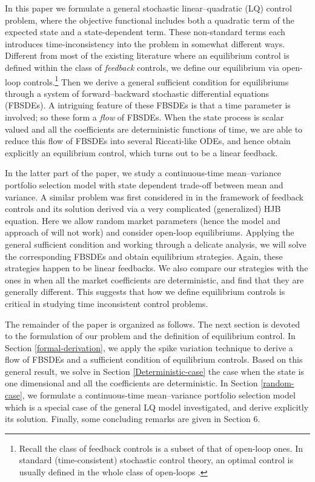 \documentclass[final]{siamltex}
\begin{document}
In this paper we formulate a general stochastic linear--quadratic (LQ) control problem, where the objective functional
 includes both a quadratic term of the expected state and a state-dependent term. These non-standard terms each introduces time-inconsistency into
 the problem in somewhat different ways. Different from most of the existing literature \cite{EL,BM,BMZ,Y} where an equilibrium control is defined
 within the class of {\it feedback} controls, we define our equilibrium via open-loop controls.\footnote{Recall the class of feedback controls is a
 subset of that of open-loop ones. In standard (time-consistent) stochastic control theory, an optimal control is usually defined in the whole class of
 open-loops \cite{FS,YZ}.}  Then we derive a general sufficient condition for equilibriums through a system of forward--backward stochastic
 differential equations (FBSDEs). A intriguing feature of these FBSDEs is that a time parameter is involved; so these form a {\it flow} of
 FBSDEs. When the state process is scalar valued and all the coefficients are deterministic functions of time, we are able to reduce  this flow of FBSDEs
  into several Riccati-like ODEs, and hence obtain explicitly an equilibrium control, which turns out to be a linear feedback.

In the latter part of the paper, we study a continuous-time mean--variance portfolio selection model with state dependent
trade-off between mean and variance. A similar problem was first considered in \cite{BMZ} in the framework of feedback controls and its solution derived via
a very complicated (generalized) HJB equation. Here we allow random market parameters (hence the model and approach of \cite{BMZ} will not work)
and consider open-loop equilibriums. Applying the general sufficient condition and working through a delicate analysis, we will solve
the corresponding FBSDEs and obtain equilibrium strategies. Again, these strategies happen to be linear feedbacks.
We also compare our strategies with the ones in \cite{BMZ} when all the market coefficients are deterministic, and find that they are generally different.
This suggests that how we define equilibrium controls is critical in studying time inconsistent control problems.

The remainder of the paper is organized as follows.  The next section is devoted to the formulation of our problem
and the definition of equilibrium control. In Section \ref{formal-derivation}, we apply the spike variation technique to derive
a flow of FBSDEs and a sufficient condition of equilibrium controls. Based on this general
result, we solve in Section \ref{Deterministic-case} the case when
the state is one dimensional and all the coefficients are deterministic. In Section \ref{random-case}, we formulate a continuous-time mean--variance portfolio
selection model which is a special case of the general LQ model investigated, and derive explicitly its solution. Finally, some concluding remarks
are given in Section 6.
\end{document}
